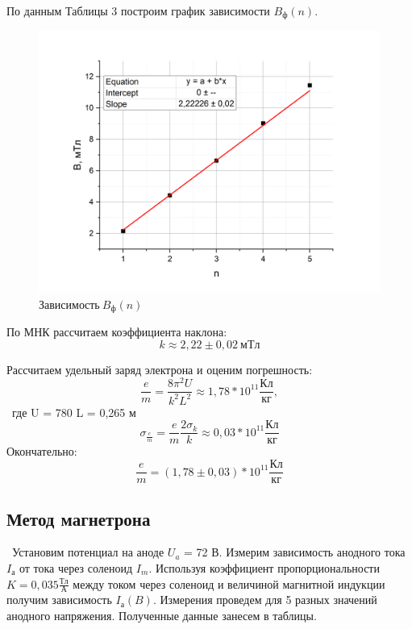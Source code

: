 \documentclass[a4paper,12pt]{article}
\begin{document}
По данным Таблицы 3 построим график зависимости $B_ф(n)$.

\begin{figure}[h]
	\begin{center}
	\includegraphics[scale=0.6]{graph2}
	\end{center}
	\caption{$Зависимость \ B_ф(n)$}
	\end{figure}

По МНК рассчитаем коэффициента наклона:
$$
	k \approx 2,22 \pm 0,02 \ мТл
$$

\newpage
Рассчитаем удельный заряд электрона и оценим погрешность:
$$
\frac{e}{m} = \frac{8\pi^2 U}{k^2 L^2} \approx 1,78*10^{11} \frac{Кл}{кг},
$$
\
 где U = 780 L = 0,265 м
 $$
 \sigma_{\frac{e}{m}} = \frac{e}{m} \frac{2\sigma_k}{k} \approx 0,03*10^{11}  \frac{Кл}{кг}
 $$
Окончательно:
$$
\frac{e}{m} =  (1,78 \pm 0,03)*10^{11} \frac{Кл}{кг}
$$

\subsection*{Метод магнетрона}
\
Установим потенциал на аноде $U_a$ = 72 В. Измерим зависимость анодного тока $I_а$ от тока через соленоид $I_m$. Используя коэффициент пропорциональности $K = 0,035 \frac{Тл}{А}$ между током через соленоид и величиной магнитной индукции получим зависимость $I_а(B)$. Измерения проведем для 5 разных значений анодного напряжения. Полученные данные занесем в таблицы.
\end{document}
